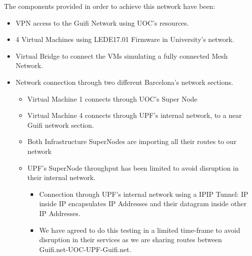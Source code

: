 The components provided in order to achieve this network have been:
\begin{itemize}
    \item VPN access to the Guifi Network using UOC's resources.
    \item 4 Virtual Machines using LEDE17.01 Firmware in University's network.
    \item Virtual Bridge to connect the VMs simulating a fully connected Mesh Network.
    \item Network connection through two different Barcelona's network sections.
    \begin{itemize}
        \item Virtual Machine 1 connects through UOC's Super Node
        \item Virtual Machine 4 connects through UPF's internal network, to a near Guifi network section.
        \item Both Infrastructure SuperNodes are importing all their routes to our network
        \item UPF's SuperNode throughput has been limited to avoid disruption in their internal network.
        \begin{itemize}
            \item Connection through UPF's internal network using a IPIP Tunnel: IP inside IP encapsulates IP Addresses and their datagram inside other IP Addresses.
            \item We have agreed to do this testing in a limited time-frame to avoid disruption in their services as we are sharing routes between Guifi.net-UOC-UPF-Guifi.net.
        \end{itemize}
    \end{itemize}
\end{itemize}

